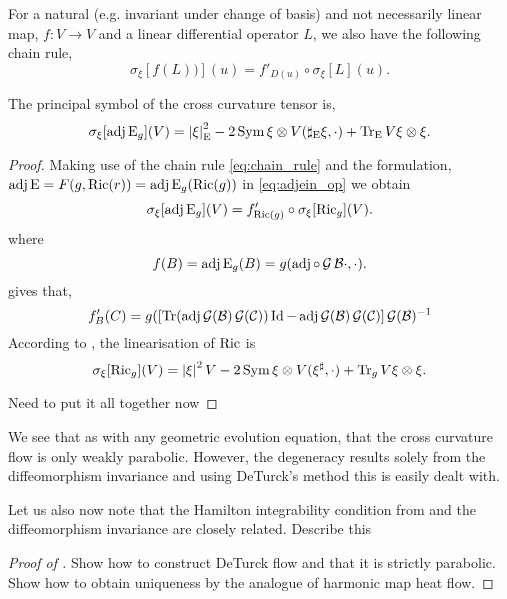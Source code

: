 \documentclass[a4paper, 12pt]{amsart}
\begin{document}
For a natural (e.g. invariant under change of basis) and not necessarily linear map, \(f : V \to V\) and a linear differential operator \(L\), we also have the following chain rule,
\begin{equation}
\label{eq:chain_rule}
\sigma_{\xi} [f(L))] (u) = f'_{D(u)} \circ \sigma_{\xi}[L] (u).
\end{equation}
\begin{lemma}
\label{lem:xcf_symbol}
The principal symbol of the cross curvature tensor is,
\[
\sigma_{\xi} [\operatorname{adj}\operatorname{E}_g] (V) = \left\lvert{\xi}\right\rvert^2_{\operatorname{E}} - 2 \operatorname{Sym} \xi \otimes V(\sharp_{\operatorname{E}}\xi, \cdot) + \operatorname{Tr}_{\operatorname{E}} V \xi \otimes \xi.
\]
\end{lemma}
\begin{proof}
Making use of the chain rule \eqref{eq:chain_rule} and the formulation, \(\operatorname{adj}\operatorname{E} = F(g, \operatorname{Ric}(r)) = \operatorname{adj}\operatorname{E}_g(\operatorname{Ric}(g))\) in \eqref{eq:adjein_op} we obtain
\[
\sigma_{\xi} [\operatorname{adj}\operatorname{E}_g] (V) = f'_{\operatorname{Ric}(g)} \circ \sigma_{\xi} [\operatorname{Ric}_g] (V).
\]
where
\[
f(B) = \operatorname{adj}\operatorname{E}_g (B) = g(\operatorname{adj} \circ \operatorname{\mathcal{G}} \mathcal{B} \cdot, \cdot).
\]
 gives that,
\[
f'_B (C) = g(\left[\operatorname{Tr}(\operatorname{adj}\operatorname{\mathcal{G}}(\mathcal{B}) \operatorname{\mathcal{G}}(\mathcal{C}))\operatorname{Id} - \operatorname{adj}\operatorname{\mathcal{G}}(\mathcal{B}) \operatorname{\mathcal{G}}(\mathcal{C})\right] \operatorname{\mathcal{G}}(\mathcal{B})^{-1}
\]
According to \cite[Section 5.1]{MR2265040}, the linearisation of \(\operatorname{Ric}\) is
\[
\sigma_{\xi} [\operatorname{Ric}_g] (V) = \left\lvert{\xi}\right\rvert^2 V - 2 \operatorname{Sym} \xi \otimes V(\xi^{\sharp}, \cdot) + \operatorname{Tr}_g V \xi \otimes \xi.
\]

{\color{red} Need to put it all together now}
\end{proof}
\begin{rem}
\label{rem:invariance_integrability}
We see that as with any geometric evolution equation, that the cross curvature flow is only weakly parabolic. However, the degeneracy results solely from the diffeomorphism invariance and using DeTurck's method this is easily dealt with.

Let us also now note that the Hamilton integrability condition from  and the diffeomorphism invariance are closely related. {\color{red} Describe this}
\end{rem}
\begin{proof}[Proof of ]
{\color{red} Show how to construct DeTurck flow and that it is strictly parabolic. Show how to obtain uniqueness by the analogue of harmonic map heat flow.}
\end{proof}
\end{document}
